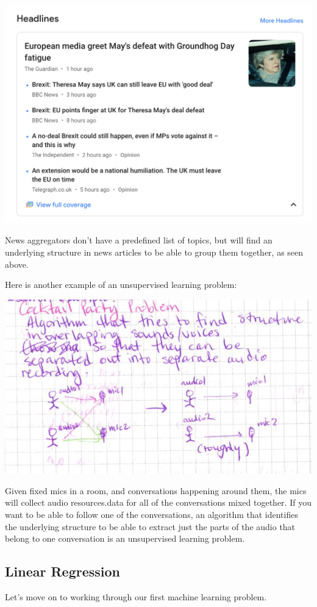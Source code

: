 \documentclass[12pt]{article}
\begin{document}
\includegraphics[width={\textwidth}]{google-news}

News aggregators don't have a predefined list of topics, but will find an underlying structure in news articles to be able to group them together, as seen above. 

Here is another example of an unsupervised learning problem:

\includegraphics[width={\textwidth}]{cocktail-party}

Given fixed mics in a room, and conversations happening around them, the mics will collect audio resources.data for all of the conversations mixed together. If you want to be able to follow one of the conversations, an algorithm that identifies the underlying structure to be able to extract just the parts of the audio that belong to one conversation is an unsupervised learning problem.

\subsection{Linear Regression}
Let's move on to working through our first machine learning problem.
\end{document}
